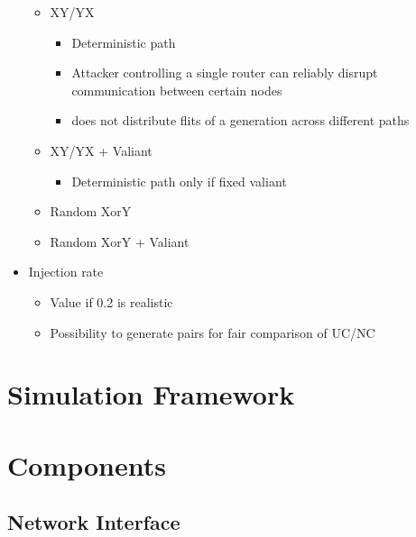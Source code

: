 \begin{itemize}
        \begin{itemize}
            \item XY/YX
                \begin{itemize}
                    \item Deterministic path
                    \item Attacker controlling a single router can reliably disrupt communication between certain nodes
                    \item does not distribute flits of a generation across different paths
                \end{itemize}
            \item XY/YX + Valiant
                \begin{itemize}
                    \item Deterministic path only if fixed valiant
                \end{itemize}
            \item Random XorY
            \item Random XorY + Valiant
        \end{itemize}
    \item Injection rate
        \begin{itemize}
            \item Value if 0.2 is realistic
            \item Possibility to generate pairs for fair comparison of UC/NC
        \end{itemize}
\end{itemize}

\section{Simulation Framework}

\section{Components}
\subsection{Network Interface}
